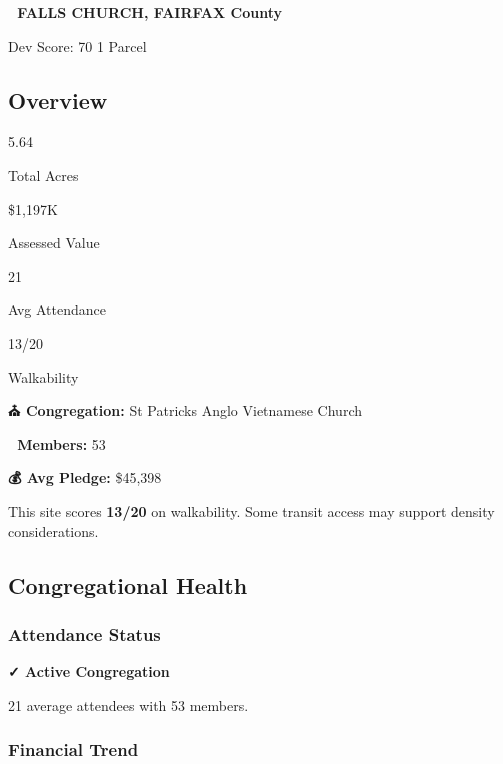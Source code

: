 \documentclass[
  letterpaper,
  DIV=11,
  numbers=noendperiod,
  oneside]{scrreprt}
\begin{document}

\textbf{📍 FALLS CHURCH, FAIRFAX County}

{Dev Score: 70} {1 Parcel}

\subsection{Overview}

{5.64}

{Total Acres}

{\$1,197K}

{Assessed Value}

{21}

{Avg Attendance}

{13/20}

{Walkability}

\textbf{⛪ Congregation:} St Patricks Anglo Vietnamese Church

\textbf{👥 Members:} 53

\textbf{💰 Avg Pledge:} \$45,398

\begin{tcolorbox}[enhanced jigsaw, bottomtitle=1mm, left=2mm, rightrule=.15mm, colbacktitle=quarto-callout-note-color!10!white, arc=.35mm, title=\textcolor{quarto-callout-note-color}{\faInfo}\hspace{0.5em}{🚶 Moderate Walkability}, bottomrule=.15mm, colback=white, colframe=quarto-callout-note-color-frame, leftrule=.75mm, titlerule=0mm, opacitybacktitle=0.6, breakable, coltitle=black, toptitle=1mm, toprule=.15mm, opacityback=0]

This site scores \textbf{13/20} on walkability. Some transit access may
support density considerations.

\end{tcolorbox}

\subsection{Congregational Health}

\subsubsection{Attendance Status}\label{attendance-status}

\textbf{✓ Active Congregation}

21 average attendees with 53 members.

\subsubsection{Financial Trend}\label{financial-trend}
\end{document}
